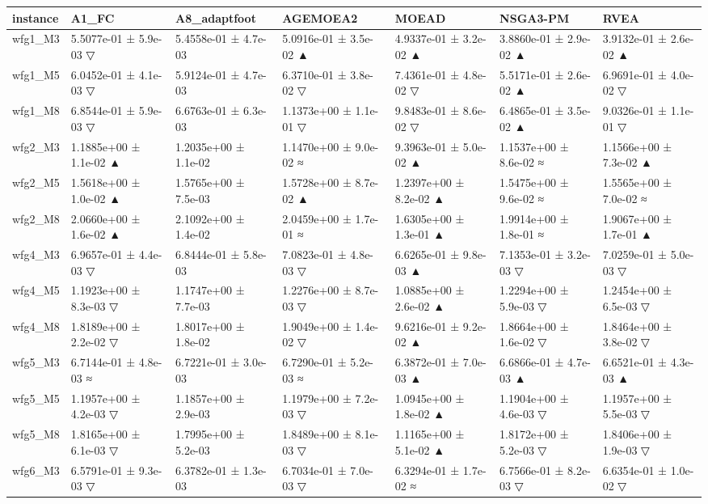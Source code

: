 \begin{tabular}{lllllll}
\toprule
instance & A1\_FC & A8\_adaptfoot & AGEMOEA2 & MOEAD & NSGA3-PM & RVEA \\
\midrule
wfg1\_M3 & 5.5077e-01 ± 5.9e-03 ▽ & 5.4558e-01 ± 4.7e-03 & 5.0916e-01 ± 3.5e-02 ▲ & 4.9337e-01 ± 3.2e-02 ▲ & 3.8860e-01 ± 2.9e-02 ▲ & 3.9132e-01 ± 2.6e-02 ▲ \\
wfg1\_M5 & 6.0452e-01 ± 4.1e-03 ▽ & 5.9124e-01 ± 4.7e-03 & 6.3710e-01 ± 3.8e-02 ▽ & 7.4361e-01 ± 4.8e-02 ▽ & 5.5171e-01 ± 2.6e-02 ▲ & 6.9691e-01 ± 4.0e-02 ▽ \\
wfg1\_M8 & 6.8544e-01 ± 5.9e-03 ▽ & 6.6763e-01 ± 6.3e-03 & 1.1373e+00 ± 1.1e-01 ▽ & 9.8483e-01 ± 8.6e-02 ▽ & 6.4865e-01 ± 3.5e-02 ▲ & 9.0326e-01 ± 1.1e-01 ▽ \\
wfg2\_M3 & 1.1885e+00 ± 1.1e-02 ▲ & 1.2035e+00 ± 1.1e-02 & 1.1470e+00 ± 9.0e-02 ≈ & 9.3963e-01 ± 5.0e-02 ▲ & 1.1537e+00 ± 8.6e-02 ≈ & 1.1566e+00 ± 7.3e-02 ▲ \\
wfg2\_M5 & 1.5618e+00 ± 1.0e-02 ▲ & 1.5765e+00 ± 7.5e-03 & 1.5728e+00 ± 8.7e-02 ▲ & 1.2397e+00 ± 8.2e-02 ▲ & 1.5475e+00 ± 9.6e-02 ≈ & 1.5565e+00 ± 7.0e-02 ≈ \\
wfg2\_M8 & 2.0660e+00 ± 1.6e-02 ▲ & 2.1092e+00 ± 1.4e-02 & 2.0459e+00 ± 1.7e-01 ≈ & 1.6305e+00 ± 1.3e-01 ▲ & 1.9914e+00 ± 1.8e-01 ≈ & 1.9067e+00 ± 1.7e-01 ▲ \\
wfg4\_M3 & 6.9657e-01 ± 4.4e-03 ▽ & 6.8444e-01 ± 5.8e-03 & 7.0823e-01 ± 4.8e-03 ▽ & 6.6265e-01 ± 9.8e-03 ▲ & 7.1353e-01 ± 3.2e-03 ▽ & 7.0259e-01 ± 5.0e-03 ▽ \\
wfg4\_M5 & 1.1923e+00 ± 8.3e-03 ▽ & 1.1747e+00 ± 7.7e-03 & 1.2276e+00 ± 8.7e-03 ▽ & 1.0885e+00 ± 2.6e-02 ▲ & 1.2294e+00 ± 5.9e-03 ▽ & 1.2454e+00 ± 6.5e-03 ▽ \\
wfg4\_M8 & 1.8189e+00 ± 2.2e-02 ▽ & 1.8017e+00 ± 1.8e-02 & 1.9049e+00 ± 1.4e-02 ▽ & 9.6216e-01 ± 9.2e-02 ▲ & 1.8664e+00 ± 1.6e-02 ▽ & 1.8464e+00 ± 3.8e-02 ▽ \\
wfg5\_M3 & 6.7144e-01 ± 4.8e-03 ≈ & 6.7221e-01 ± 3.0e-03 & 6.7290e-01 ± 5.2e-03 ≈ & 6.3872e-01 ± 7.0e-03 ▲ & 6.6866e-01 ± 4.7e-03 ▲ & 6.6521e-01 ± 4.3e-03 ▲ \\
wfg5\_M5 & 1.1957e+00 ± 4.2e-03 ▽ & 1.1857e+00 ± 2.9e-03 & 1.1979e+00 ± 7.2e-03 ▽ & 1.0945e+00 ± 1.8e-02 ▲ & 1.1904e+00 ± 4.6e-03 ▽ & 1.1957e+00 ± 5.5e-03 ▽ \\
wfg5\_M8 & 1.8165e+00 ± 6.1e-03 ▽ & 1.7995e+00 ± 5.2e-03 & 1.8489e+00 ± 8.1e-03 ▽ & 1.1165e+00 ± 5.1e-02 ▲ & 1.8172e+00 ± 5.2e-03 ▽ & 1.8406e+00 ± 1.9e-03 ▽ \\
wfg6\_M3 & 6.5791e-01 ± 9.3e-03 ▽ & 6.3782e-01 ± 1.3e-03 & 6.7034e-01 ± 7.0e-03 ▽ & 6.3294e-01 ± 1.7e-02 ≈ & 6.7566e-01 ± 8.2e-03 ▽ & 6.6354e-01 ± 1.0e-02 ▽ \\

\end{tabular}
